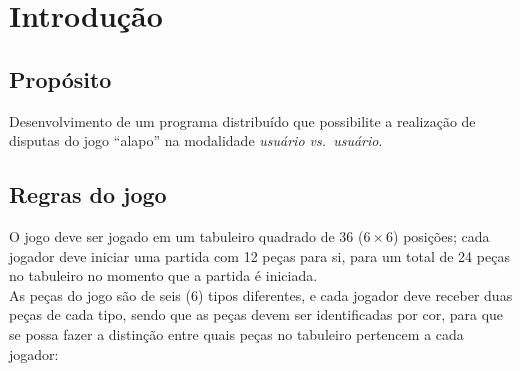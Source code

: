 \chapter{Introdução}

\section{Propósito}
Desenvolvimento de um programa distribuído que possibilite a realização de disputas do jogo
``\gls{alapo}''\cite{alapoWebsite} na modalidade
\textit{usuário vs.\ usuário}.

\section{Regras do jogo}\label{section:regras}
O jogo deve ser jogado em um tabuleiro quadrado de 36 ($6 \times 6$) posições; cada jogador deve iniciar uma partida com
12 peças para si, para um total de 24 peças no tabuleiro no momento que a partida é iniciada.\\
As peças do jogo são de seis (6) tipos diferentes, e cada jogador deve receber duas peças de cada tipo, sendo que as
peças devem ser identificadas por cor, para que se possa fazer a distinção entre quais peças no tabuleiro pertencem a
cada jogador:


